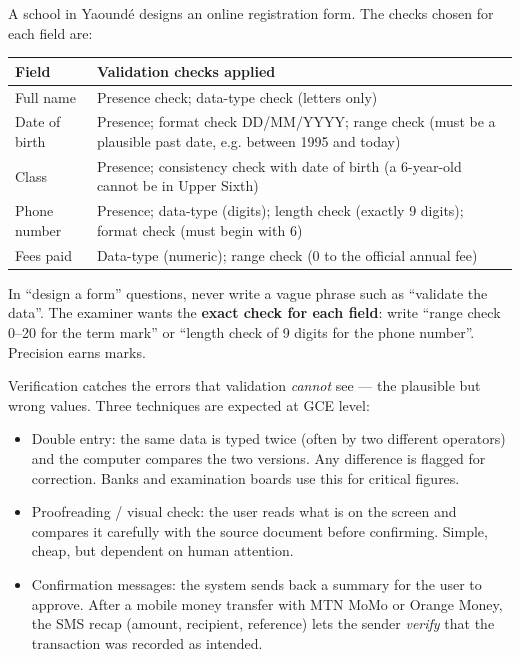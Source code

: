 \documentclass[11pt]{article}
\newcommand{\cle}[1]{{\popxbold\color{popdark}#1}}
\newcounter{popsec}
\newcounter{popsub}
\newcommand{\courssub}[1]{%
  \stepcounter{popsub}%
  \par\vspace{9pt}\noindent{\popxbold\fontsize{11.5}{13}\selectfont\color{popink}{\color{poporange}\thepopsec.\thepopsub}\hspace{6pt}#1}\par\nopagebreak\vspace{4pt}
}
\begin{document}
\begin{exemplebox}
A school in Yaoundé designs an online registration form. The checks chosen for each field are:

\begin{center}
\begin{tabularx}{\linewidth}{|l|X|}
\hline
\rowcolor{popblueL}\textbf{Field} & \textbf{Validation checks applied} \\
\hline
Full name & Presence check; data-type check (letters only) \\
\hline
\rowcolor{popblueL}Date of birth & Presence; format check DD/MM/YYYY; range check (must be a plausible past date, e.g. between 1995 and today) \\
\hline
Class & Presence; consistency check with date of birth (a 6-year-old cannot be in Upper Sixth) \\
\hline
\rowcolor{popblueL}Phone number & Presence; data-type (digits); length check (exactly 9 digits); format check (must begin with 6) \\
\hline
Fees paid & Data-type (numeric); range check (0 to the official annual fee) \\
\hline
\end{tabularx}
\end{center}
\end{exemplebox}

\begin{attention}
In ``design a form'' questions, never write a vague phrase such as ``validate the data''. The examiner wants the \textbf{exact check for each field}: write ``range check 0--20 for the term mark'' or ``length check of 9 digits for the phone number''. Precision earns marks.
\end{attention}

\courssub{Verification Techniques}

Verification catches the errors that validation \emph{cannot} see — the plausible but wrong values. Three techniques are expected at GCE level:

\begin{itemize}
\item \cle{Double entry}: the same data is typed twice (often by two different operators) and the computer compares the two versions. Any difference is flagged for correction. Banks and examination boards use this for critical figures.
\item \cle{Proofreading / visual check}: the user reads what is on the screen and compares it carefully with the source document before confirming. Simple, cheap, but dependent on human attention.
\item \cle{Confirmation messages}: the system sends back a summary for the user to approve. After a mobile money transfer with MTN MoMo or Orange Money, the SMS recap (amount, recipient, reference) lets the sender \emph{verify} that the transaction was recorded as intended.
\end{itemize}
\end{document}
